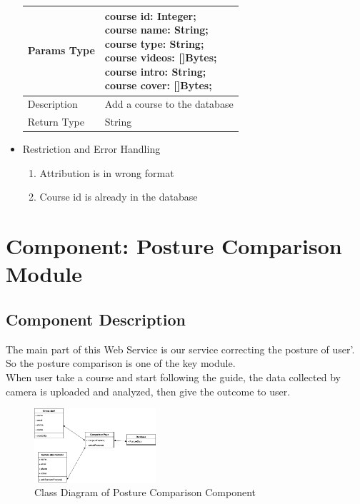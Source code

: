 \documentclass[16pt]{scrreprt}
\begin{document}
\begin{itemize}
\begin{center}
\begin{tabular}{p{5cm}p{10cm}}
        \hline
        Params Type & \makecell[l]{course id: Integer;\\course name: String;\\course type: String;\\course videos: []Bytes;\\course intro: String;\\course cover: []Bytes;\\}\\
        \hline
        Description & Add a course to the database\\
        \hline
        Return Type & String\\
        \hline
    \end{tabular}
\end{center}
\item Restriction and Error Handling\\
\begin{enumerate}
	\item Attribution is in wrong format
	\item Course id is already in the database
\end{enumerate} 
\end{itemize}

\section{Component: Posture Comparison Module}
\subsection{Component Description}
The main part of this Web Service is our service correcting the posture of user’. So the posture comparison is one of the key module. \\ 
When user take a course and start following the guide, the data collected by camera is uploaded and analyzed, then give the outcome to user.\\ 

\begin{figure}[H]
	\centering
	\includegraphics[width=0.4\textwidth]{diagrams/class-comparison.png}
	\caption{Class Diagram of Posture Comparison Component}
\end{figure}
\end{document}

